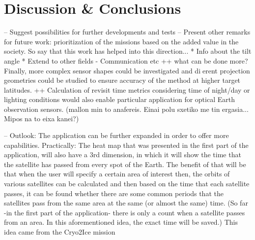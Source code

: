 \chapter{Discussion \& Conclusions}
\label{chap:5}

--  Suggest possibilities for further developments and tests
--  Present other remarks for future work: prioritization of the missions based on the added value in the society. So say that this work has helped into this direction...
* Info about the tilt angle
* Extend to other fields - Communication etc
++ what can be done more? Finally, more complex sensor shapes could be investigated and dierent projection geometries could be studied to ensure accuracy of the method at higher target latitudes.
++ Calculation of revisit time metrics considering
time of night/day or lighting conditions would also enable
particular application for optical Earth observation
sensors. (mallon min to anafereis. Einai polu sxetiko me tin ergasia... Mipos na to eixa kanei?)

-- Outlook:
The application can be further expanded in order to offer more capabilities. Practically: The heat map that was presented in the first part of the application, will also have a 3rd dimension, in which it will show the time that the satellite has passed from every spot of the Earth. The benefit of that will be that when the user will specify a certain area of interest then, the orbits of various satellites can be calculated and then based on the time that each satellite passes, it can be found whether there are some common periods that the satellites pass from the same area at the same (or almost the same) time. 
(So far -in the first part of the application- there is only a count when a satellite passes from an area. In this aforementioned idea, the exact time will be saved.)
This idea came from the Cryo2Ice mission %


